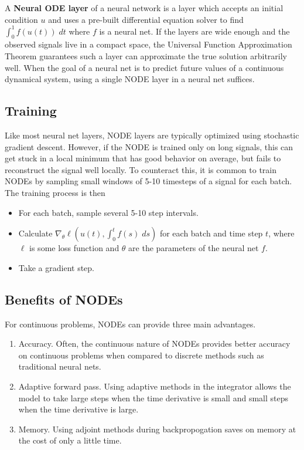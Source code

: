 \documentclass[12pt,oneside]{article}
\theoremstyle{plain}
\begin{document}
A \textbf{Neural ODE layer} of a neural network is a layer which accepts an initial condition $u$ and uses a pre-built differential equation solver to find $\int_0^1 f(u(t))\;dt$ where $f$ is a neural net. If the layers are wide enough and the observed signals live in a compact space, the Universal Function Approximation Theorem guarantees such a layer can approximate the true solution arbitrarily well. When the goal of a neural net is to predict future values of a continuous dynamical system, using a single NODE layer in a neural net suffices. 

\subsection{Training}
Like most neural net layers, NODE layers are typically optimized using stochastic gradient descent. However, if the NODE is trained only on long signals, this can get stuck in a local minimum that has good behavior on average, but fails to reconstruct the signal well locally. To counteract this, it is common to train NODEs by sampling small windows of 5-10 timesteps of a signal for each batch. The training process is then

\begin{itemize}
    \item For each batch, sample several 5-10 step intervals.

    \item Calculate $\nabla_{\theta}\ell(u(t), \int_0^t f(s) \; ds)$ for each batch and time step $t$, where $\ell$ is some loss function and $\theta$ are the parameters of the neural net $f$.

    \item Take a gradient step. 
\end{itemize}

\subsection{Benefits of NODEs}
For continuous problems, NODEs can provide three main advantages. 
\begin{enumerate}
    \item Accuracy. Often, the continuous nature of NODEs provides better accuracy on continuous problems when compared to discrete methods such as traditional neural nets.

    \item Adaptive forward pass. Using adaptive methods in the integrator allows the model to take large steps when the time derivative is small and small steps when the time derivative is large.

    \item Memory. Using adjoint methods during backpropogation saves on memory at the cost of only a little time. 
\end{enumerate}
\end{document}
